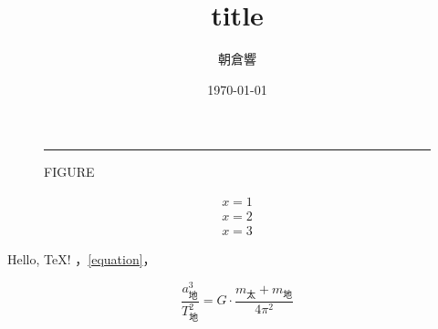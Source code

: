 \documentclass[a4paper,lualatex,ja=standard,oneside,fleqn]{bxjsarticle}
\title{title}
\author{朝倉響}
\date{\today}
\begin{document}
  \maketitle
  \begin{figure}[bthp]
    \centering
    \rule{0.45\hsize}{0.1\vsize}
    \caption{FIGURE}
    \label{figure}
  \end{figure}

  \begin{align}
    x=1\label{equation}\\x=2\\x=3
  \end{align}

  Hello, \TeX! ，\eqref{equation}，\citep{sin2020passivity}

  \[ %
    \frac{a_{地}^3}{T_{地}^2} = G\cdot\frac{m_{太} + m_{地}}{4\pi^2}
  \]

  
\end{document}
